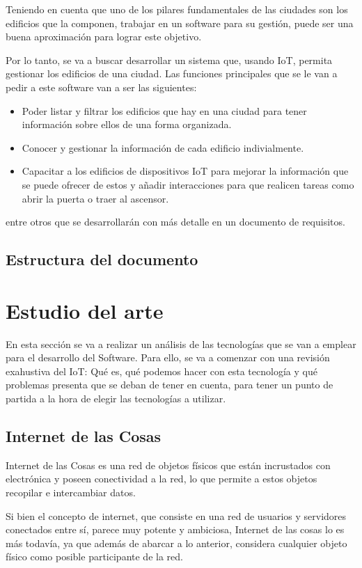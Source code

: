 \documentclass[12pt, a4paper, twoside]{article}
\begin{document}
Teniendo en cuenta que uno de los pilares fundamentales de las ciudades son los edificios que la componen, 
trabajar en un software para su gestión, puede ser una buena aproximación para lograr este objetivo.

Por lo tanto, se va a buscar desarrollar un sistema que, usando IoT, permita gestionar los edificios
de una ciudad. Las funciones principales que se le van a pedir a este software van a ser las siguientes:
\begin{itemize}
  \item Poder listar y filtrar los edificios que hay en una ciudad para tener información sobre ellos
        de una forma organizada.
  \item Conocer y gestionar la información de cada edificio indivialmente.
  \item Capacitar a los edificios de dispositivos IoT para mejorar la información que se puede ofrecer
        de estos y añadir interacciones para que realicen tareas como abrir la puerta o traer al 
        ascensor.
\end{itemize}
entre otros que se desarrollarán con más detalle en un documento de requisitos.


\subsection{Estructura del documento}

\section{Estudio del arte}
En esta sección se va a realizar un análisis de las tecnologías que se van a emplear para el 
desarrollo del Software. Para ello, se va a comenzar con una revisión exahustiva del IoT: 
Qué es, qué podemos hacer con esta tecnología y qué problemas presenta que se deban de tener en cuenta,
para tener un punto de partida a la hora de elegir las tecnologías a utilizar.
\subsection{Internet de las Cosas}
Internet de las Cosas es una red de objetos físicos que están incrustados con electrónica y poseen 
conectividad a la red, lo que permite a estos objetos recopilar e intercambiar datos.

Si bien el concepto de internet, que consiste en una red de usuarios y servidores conectados entre sí,
parece muy potente y ambiciosa, Internet de las cosas lo es más todavía, ya que además de abarcar a 
lo anterior, considera cualquier objeto físico como posible participante de la red.
\end{document}
